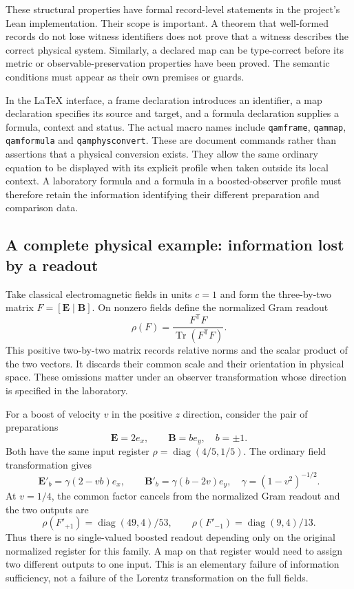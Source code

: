 \documentclass[11pt,a4paper]{article}
\begin{document}
These structural properties have formal record-level statements in
the project's Lean implementation. Their scope is important. A
theorem that well-formed records do not lose witness identifiers
does not prove that a witness describes the correct physical system.
Similarly, a declared map can be type-correct before its metric or
observable-preservation properties have been proved. The semantic
conditions must appear as their own premises or guards.

In the LaTeX interface, a frame declaration introduces an identifier,
a map declaration specifies its source and target, and a formula
declaration supplies a formula, context and status. The actual macro
names include \texttt{qamframe}, \texttt{qammap},
\texttt{qamformula} and \texttt{qamphysconvert}. These are document
commands rather than assertions that a physical conversion exists.
They allow the same ordinary equation to be displayed with its
explicit profile when taken outside its local context. A laboratory
formula and a formula in a boosted-observer profile must therefore
retain the information identifying their different preparation and
comparison data.

\subsection{A complete physical example: information lost by a readout}
Take classical electromagnetic fields in units $c=1$ and form the
three-by-two matrix $F=[\boldsymbol E\mid\boldsymbol B]$. On nonzero
fields define the normalized Gram readout
\begin{equation}
 \rho(F)=\frac{F^{\mathsf T}F}{\operatorname{Tr}(F^{\mathsf T}F)}.
\end{equation}
This positive two-by-two matrix records relative norms and the scalar
product of the two vectors. It discards their common scale and their
orientation in physical space. These omissions matter under an
observer transformation whose direction is specified in the laboratory.

For a boost of velocity $v$ in the positive $z$ direction, consider
the pair of preparations
\begin{equation}
 \boldsymbol E=2e_x,\qquad \boldsymbol B=b e_y,\quad b=\pm1.
\end{equation}
Both have the same input register $\rho=\operatorname{diag}(4/5,1/5)$.
The ordinary field transformation gives
\begin{equation}
 \boldsymbol E'_b=\gamma(2-vb)e_x,\qquad
 \boldsymbol B'_b=\gamma(b-2v)e_y,
 \quad \gamma=(1-v^2)^{-1/2}.
\end{equation}
At $v=1/4$, the common factor cancels from the normalized Gram
readout and the two outputs are
\begin{equation}
 \rho(F'_{+1})=\operatorname{diag}(49,4)/53,\qquad
 \rho(F'_{-1})=\operatorname{diag}(9,4)/13.
\end{equation}
Thus there is no single-valued boosted readout depending only on
the original normalized register for this family. A map on that
register would need to assign two different outputs to one input.
This is an elementary failure of information sufficiency, not a
failure of the Lorentz transformation on the full fields.
\end{document}
